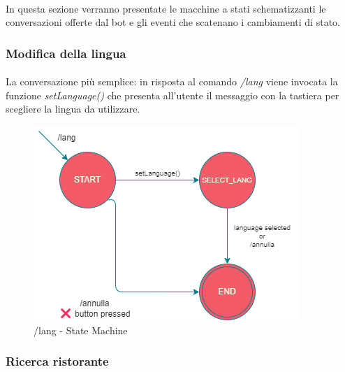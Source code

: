 \documentclass[a4paper, 12pt]{article}
\begin{document}
	\paragraph{}
	In questa sezione verranno presentate le macchine a stati schematizzanti le conversazioni offerte dal bot e gli eventi che scatenano i cambiamenti di stato.
	\subsubsection{Modifica della lingua}
	\paragraph{}
	La conversazione più semplice: in risposta al comando \textit{/lang} viene invocata la funzione \textit{setLanguage()} che presenta all'utente il messaggio con la tastiera per scegliere la lingua da utilizzare.\\
	\begin{figure}[h!]
		\centering
		\includegraphics[scale=0.7]{TasteIt_Lang_StateMachine.png}
		\caption{/lang - State Machine}
		\label{fig:LangStateMachine}
	\end{figure}
	
	\newpage
	\subsubsection{Ricerca ristorante}
\end{document}
